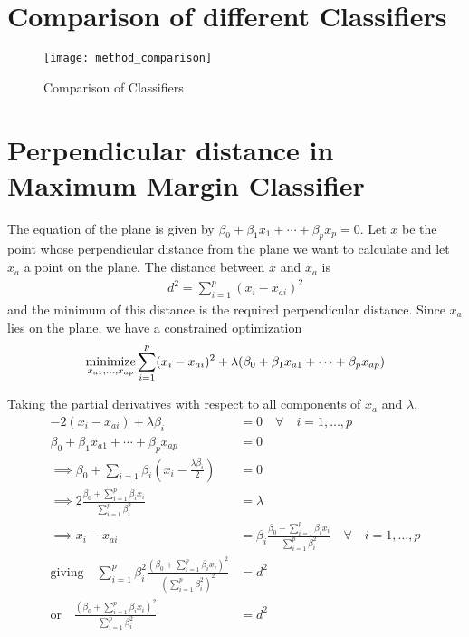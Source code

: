 \documentclass[../statistical_learning_notes.tex]{subfiles}
\begin{document}
\section{Comparison of different Classifiers}
    \begin{figure}[h]
        \texttt{[image: method\_comparison]}
        \centering
        \caption {Comparison of Classifiers}
        \label{fig:classifier_comparison} %
    \end{figure}


\section{Perpendicular distance in Maximum Margin Classifier}\label{sec:appendix_mmc_perpendicular_dist}
The equation of the plane is given by $\beta_{0} + \beta_{1}x_{1} + \cdots + \beta_{p}x_{p} = 0$. Let $x$ be the point whose perpendicular distance from the plane we want to calculate and let $x_{a}$ a point on the plane. The distance between $x$ and $x_{a}$ is
\begin{align*}
    d^{2} = \sum_{i=1}^{p} (x_{i} - x_{ai})^{2}
\end{align*}
and the minimum of this distance is the required perpendicular distance. Since $x_{a}$ lies on the plane, we have a constrained optimization
\begin{align*}
    \operatorname*{minimize}_{x_{a1}, \ldots, x_{ap}} \sum_{i=1}^{p} (x_{i} - x_{ai})^{2} + \lambda (\beta_{0} + \beta_{1}x_{a1} + \cdots + \beta_{p}x_{ap})
\end{align*}

Taking the partial derivatives with respect to all components of $x_{a}$ and $\lambda$,
\begin{align*}
    -2(x_{i} - x_{ai}) + \lambda \beta_{i} &= 0 \quad \forall \quad i = 1, \ldots, p\\
    \beta_{0} + \beta_{1}x_{a1} + \cdots + \beta_{p}x_{ap} &= 0\\
    \implies \beta_{0} + \sum_{i=1} \beta_{i}(x_{i} - \frac{\lambda \beta_{i}}{2}) &= 0\\
    \implies 2\frac{\beta_{0} + \sum_{i=1}^{p} \beta_{i}x_{i}}{\sum_{i=1}^{p}\beta_{i}^{2}} &= \lambda\\
    \implies x_{i} - x_{ai} &= \beta_{i} \frac{\beta_{0} + \sum_{i=1}^{p} \beta_{i}x_{i}}{\sum_{i=1}^{p}\beta_{i}^{2}} \quad \forall \quad i = 1, \ldots, p\\
    \text{giving} \quad \sum_{i=1}^{p} \beta_{i}^{2} \frac{(\beta_{0} + \sum_{i=1}^{p} \beta_{i}x_{i})^{2}}{(\sum_{i=1}^{p}\beta_{i}^{2})^{2}} &= d^{2}\\
    \text{or} \quad \frac{(\beta_{0} + \sum_{i=1}^{p} \beta_{i}x_{i})^{2}}{\sum_{i=1}^{p}\beta_{i}^{2}} &= d^{2}
\end{align*}
\end{document}
